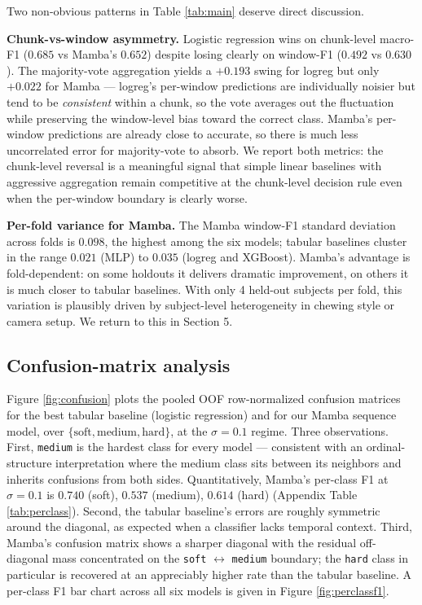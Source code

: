 \documentclass{article}
\begin{document}
Two non-obvious patterns in Table \ref{tab:main} deserve direct discussion.

\textbf{Chunk-vs-window asymmetry.} Logistic regression wins on chunk-level macro-F1 ($0.685$ vs Mamba's $0.652$) despite losing clearly on window-F1 ($0.492$ vs $0.630$). The majority-vote aggregation yields a $+0.193$ swing for logreg but only $+0.022$ for Mamba --- logreg's per-window predictions are individually noisier but tend to be \emph{consistent} within a chunk, so the vote averages out the fluctuation while preserving the window-level bias toward the correct class. Mamba's per-window predictions are already close to accurate, so there is much less uncorrelated error for majority-vote to absorb. We report both metrics: the chunk-level reversal is a meaningful signal that simple linear baselines with aggressive aggregation remain competitive at the chunk-level decision rule even when the per-window boundary is clearly worse.

\textbf{Per-fold variance for Mamba.} The Mamba window-F1 standard deviation across folds is $0.098$, the highest among the six models; tabular baselines cluster in the range $0.021$ (MLP) to $0.035$ (logreg and XGBoost). Mamba's advantage is fold-dependent: on some holdouts it delivers dramatic improvement, on others it is much closer to tabular baselines. With only 4 held-out subjects per fold, this variation is plausibly driven by subject-level heterogeneity in chewing style or camera setup. We return to this in Section 5.

\subsection{Confusion-matrix analysis}

Figure \ref{fig:confusion} plots the pooled OOF row-normalized confusion matrices for the best tabular baseline (logistic regression) and for our Mamba sequence model, over $\{\text{soft}, \text{medium}, \text{hard}\}$, at the $\sigma = 0.1$ regime. Three observations. First, \texttt{medium} is the hardest class for every model --- consistent with an ordinal-structure interpretation where the medium class sits between its neighbors and inherits confusions from both sides. Quantitatively, Mamba's per-class F1 at $\sigma = 0.1$ is $0.740$ (soft), $0.537$ (medium), $0.614$ (hard) (Appendix Table \ref{tab:perclass}). Second, the tabular baseline's errors are roughly symmetric around the diagonal, as expected when a classifier lacks temporal context. Third, Mamba's confusion matrix shows a sharper diagonal with the residual off-diagonal mass concentrated on the \texttt{soft} $\leftrightarrow$ \texttt{medium} boundary; the \texttt{hard} class in particular is recovered at an appreciably higher rate than the tabular baseline. A per-class F1 bar chart across all six models is given in Figure \ref{fig:perclassf1}.
\end{document}
